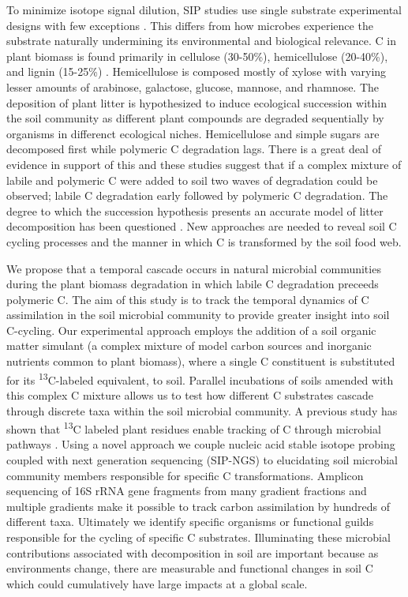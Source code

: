 To minimize isotope signal dilution, SIP studies use single substrate experimental designs with few exceptions \cite{Lueders_2003,Chauhan_2009}. This differs from how microbes experience the substrate naturally undermining its environmental and biological relevance. C in plant biomass is found primarily in cellulose (30-50\%), hemicellulose (20-40\%), and lignin (15-25\%) \cite{Lynd_2002}. Hemicellulose is composed mostly of xylose with varying lesser amounts of arabinose, galactose, glucose, mannose, and rhamnose. The deposition of plant litter is hypothesized to induce ecological succession within the soil community as different plant compounds are degraded sequentially by organisms in differenct ecological niches. Hemicellulose and simple sugars are decomposed first while polymeric C degradation lags. There is a great deal of evidence in support of this \cite{GARRETT_1951, Alexander_1964, Engelking_2007, Hu_1997, Anderson_1973, Stotzky_1961, Alden_2001, Furukawa_1996, Fontaine_2003, Blagodatskaya_2007, Jenkins_2010, Rui_2009, Fierer_2010, Gessner_2010} and these studies suggest that if a complex mixture of labile and polymeric C were added to soil two waves of degradation could be observed; labile C degradation early followed by polymeric C degradation. The degree to which the succession hypothesis presents an accurate model of litter decomposition has been questioned \cite{Kj_ller_1982,Frankland_1998,Osono_2005}. New approaches are needed to reveal soil C cycling processes and the manner in which C is transformed by the soil food web.  

We propose that a temporal cascade occurs in natural microbial communities during the plant biomass degradation in which labile C degradation preceeds polymeric C. The aim of this study is to track the temporal dynamics of C assimilation in the soil microbial community to provide greater insight into soil C-cycling. Our experimental approach employs the addition of a soil organic matter simulant (a complex mixture of model carbon sources and inorganic nutrients common to plant biomass), where a single C constituent is substituted for its \textsuperscript{13}C-labeled equivalent, to soil. Parallel incubations of soils amended with this complex C mixture allows us to test how different C substrates cascade through discrete taxa within the soil microbial community. A previous study has shown that \textsuperscript{13}C labeled plant residues enable tracking of C through microbial pathways \cite{Evershed_2006}. Using a novel approach we couple nucleic acid stable isotope probing coupled with next generation sequencing (SIP-NGS) to elucidating soil microbial community members responsible for specific C transformations. Amplicon sequencing of 16S rRNA gene fragments from many gradient fractions and multiple gradients make it possible to track carbon assimilation by hundreds of different taxa. Ultimately we identify specific organisms or functional guilds responsible for the cycling of specific C substrates. Illuminating these microbial contributions associated with decomposition in soil are important because as environments change, there are measurable and functional changes in soil C \cite{Grandy_2008} which could cumulatively have large impacts at a global scale. 

